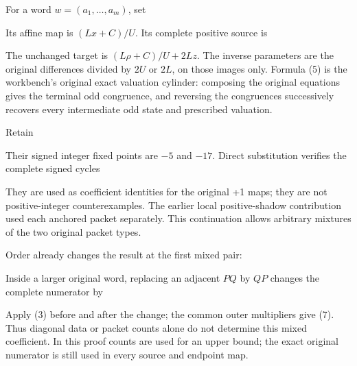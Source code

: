 
For a word \(w=(a_1,\ldots,a_m)\), set


Its affine map is \((Lx+C)/U\). Its complete positive source is


The unchanged target is \((L\rho+C)/U+2Lz\). The inverse parameters are
the original differences divided by \(2U\) or \(2L\), on those images
only. Formula (5) is the workbench's original exact valuation cylinder:
composing the original equations gives the terminal odd congruence, and
reversing the congruences successively recovers every intermediate odd
state and prescribed valuation.

Retain


Their signed integer fixed points are \(-5\) and \(-17\). Direct
substitution verifies the complete signed cycles


They are used as coefficient identities for the original +1 maps; they
are not positive-integer counterexamples. The earlier local
positive-shadow contribution used each anchored packet separately. This
continuation allows arbitrary mixtures of the two original packet types.

Order already changes the result at the first mixed pair:


Inside a larger original word, replacing an adjacent \(PQ\) by \(QP\)
changes the complete numerator by


Apply (3) before and after the change; the common outer multipliers give
(7). Thus diagonal data or packet counts alone do not determine this
mixed coefficient. In this proof counts are used for an upper bound; the
exact original numerator is still used in every source and endpoint map.

